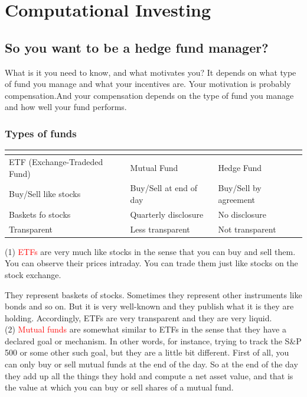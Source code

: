 \documentclass[12pt]{article}
\begin{document}
\section{Computational Investing}
\subsection{So you want to be a hedge fund manager?}

What is it you need to know, and what motivates you? It depends on what type of fund you manage and what your incentives are. Your motivation is probably compensation.And your compensation depends on the type of fund you manage and how well your fund performs.

\subsubsection{Types of funds}

\begin{table}[!ht]
\centering

\begin{tabular}{l | l | l }
\multicolumn{2}{c}{} \\ [-10pt]
\hline
 ETF (Exchange-Tradeded Fund) & Mutual Fund & Hedge Fund \\
\hline
Buy/Sell like stocks & Buy/Sell at end of day & Buy/Sell by agreement \\
Baskets fo stocks & Quarterly disclosure & No disclosure \\
Transparent & Less transparent & Not transparent \\
\hline
\end{tabular}
\end{table}

\noindent
(1) \textcolor{red}{ETFs} are very much like stocks in the sense that you can buy and sell them. You can observe their prices intraday. You can trade them just like stocks on the stock exchange. 

They represent baskets of stocks. Sometimes they represent other instruments like bonds and so on. But it is very well-known and they publish what it is they are holding. Accordingly, ETFs are very transparent and they are very liquid. \\[5pt]
\noindent
(2) \textcolor{red}{Mutual funds} are somewhat similar to ETFs in the sense that they have a declared goal or mechanism. In other words, for instance, trying to track the S\&P 500 or some other such goal, but they are a little bit different. First of all, you can only buy or sell mutual funds at the end of the day. So at the end of the day they add up all the things they hold and compute a net asset value, and that is the value at which you can buy or sell shares of a mutual fund. 
\end{document}
